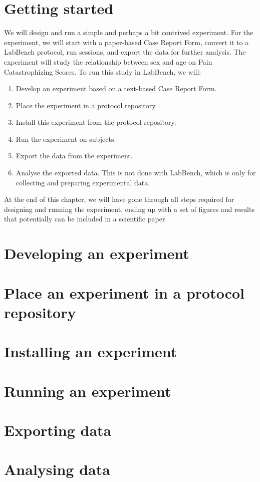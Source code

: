 \section{Getting started}

We will design and run a simple and perhaps a bit contrived experiment. For the experiment, we will start with a paper-based Case Report Form, convert it to a LabBench protocol, run sessions, and export the data for further analysis. The experiment will study the relationship between sex and age on Pain Catastrophizing Scores. To run this study in LabBench, we will:

\begin{enumerate}
\item Develop an experiment based on a text-based Case Report Form.
\item Place the experiment in a protocol repository.
\item Install this experiment from the protocol repository.
\item Run the experiment on subjects.
\item Export the data from the experiment.
\item Analyse the exported data. This is not done with LabBench, which is only for collecting and preparing experimental data.
\end{enumerate}   

At the end of this chapter, we will have gone through all steps required for designing and running the experiment, ending up with a set of figures and results that potentially can be included in a scientific paper.

\section{Developing an experiment}


\section{Place an experiment in a protocol repository}


\section{Installing an experiment}


\section{Running an experiment}


\section{Exporting data}


\section{Analysing data}

